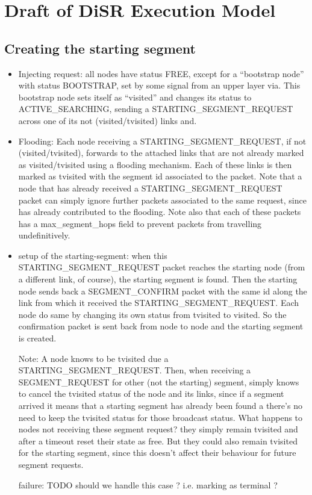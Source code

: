 \documentclass[final,journal,letterpaper]{IEEEtran}
\begin{document}
\section{Draft of DiSR Execution Model}

\subsection{Creating the starting segment}

\begin{itemize}

\item{Injecting request}: all nodes have status FREE, except for a
“bootstrap node” with status BOOTSTRAP, set by some signal from an
upper layer via. This bootstrap node sets itself as “visited” and
changes its status to ACTIVE\_SEARCHING, sending a
STARTING\_SEGMENT\_REQUEST across one of its not (visited/tvisited)
links and.  

\item{Flooding}: Each node receiving a STARTING\_SEGMENT\_REQUEST,
if not (visited/tvisited),  forwards  to the attached links that are
not already marked as visited/tvisited using a flooding mechanism.
Each of these links is then marked as tvisited with the segment id
associated to the packet. Note that a node that has already received a
STARTING\_SEGMENT\_REQUEST packet can simply ignore further packets
associated to the same request, since has already contributed to the
flooding. Note also that each of these packets has a max\_segment\_hops
field to prevent packets from travelling undefinitively.  

\item{setup of the starting-segment}: when this STARTING\_SEGMENT\_REQUEST packet reaches
the starting node (from a different link, of course), the starting
segment is found. Then the starting node sends back a SEGMENT\_CONFIRM
packet with the same id along the link from which it received the
STARTING\_SEGMENT\_REQUEST. Each node do same by changing its own status
from tvisited to visited. So the confirmation packet is sent back from
node to node and the starting segment is created. 

Note: A node knows to be tvisited due a  STARTING\_SEGMENT\_REQUEST.
Then, when receiving a SEGMENT\_REQUEST for other (not the starting)
segment, simply knows to cancel the tvisited status of the node and
its links, since if a segment arrived it means that a starting segment
has already been found a there’s no need to keep the tvisited status
for those broadcast status. What happens to nodes not receiving these
segment request? they simply remain tvisited and after a timeout reset
their state as free. But they could also remain tvisited for the
starting segment, since this doesn’t affect their behaviour for future
segment requests.  

failure: TODO should we handle this case ? i.e.
marking as terminal ?

\end{itemize}
\end{document}

